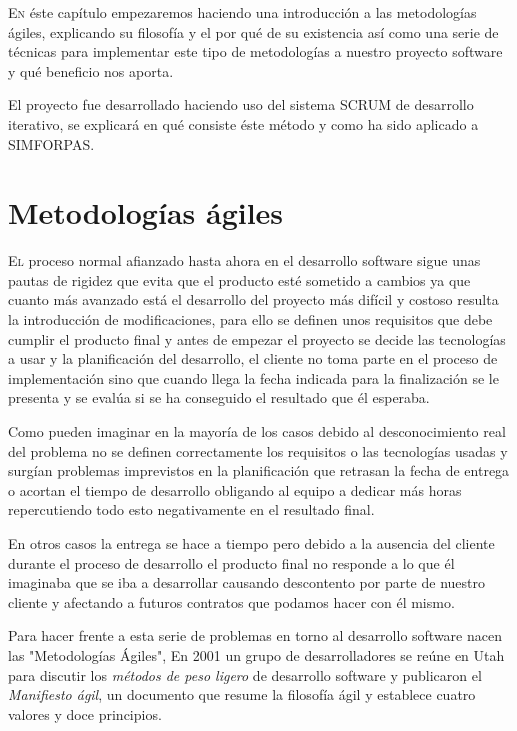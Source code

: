 \documentclass[12pt,a4paper,spanish]{book} %
\begin{document}
\lettrine{E}{n} éste capítulo empezaremos haciendo una introducción a las metodologías ágiles, explicando su filosofía y el por qué de su existencia así como una serie de técnicas para implementar este tipo de metodologías a nuestro proyecto software y qué beneficio nos aporta.

El proyecto fue desarrollado haciendo uso del sistema SCRUM de desarrollo iterativo, se explicará en qué consiste éste método y como ha sido aplicado a SIMFORPAS.

\section{Metodologías ágiles}

\lettrine{E}{l} proceso normal afianzado hasta ahora en el desarrollo software sigue unas pautas de rigidez que evita que el producto esté sometido a cambios ya que cuanto más avanzado está el desarrollo del proyecto más difícil y costoso resulta la introducción de modificaciones, para ello se definen unos requisitos que debe cumplir el producto final y antes de empezar el proyecto se decide las tecnologías a usar y la planificación del desarrollo, el cliente no toma parte en el proceso de implementación sino que cuando llega la fecha indicada para la finalización se le presenta y se evalúa si se ha conseguido el resultado que él esperaba.

Como pueden imaginar en la mayoría de los casos debido al desconocimiento real del problema no se definen correctamente los requisitos o las tecnologías usadas y surgían problemas imprevistos en la planificación que retrasan la fecha de entrega o acortan el tiempo de desarrollo obligando al equipo a dedicar más horas repercutiendo todo esto negativamente en el resultado final.

En otros casos la entrega se hace a tiempo pero debido a la ausencia del cliente durante el proceso de desarrollo el producto final no responde a lo que él imaginaba que se iba a desarrollar causando descontento por parte de nuestro cliente y afectando a futuros contratos que podamos hacer con él mismo.

Para hacer frente a esta serie de problemas en torno al desarrollo software nacen las "Metodologías Ágiles", En 2001 un grupo de desarrolladores se reúne en Utah para discutir los \emph{métodos de peso ligero} de desarrollo software y publicaron el \emph{Manifiesto ágil}, un documento que resume la filosofía ágil y establece cuatro valores y doce principios.
\end{document}
